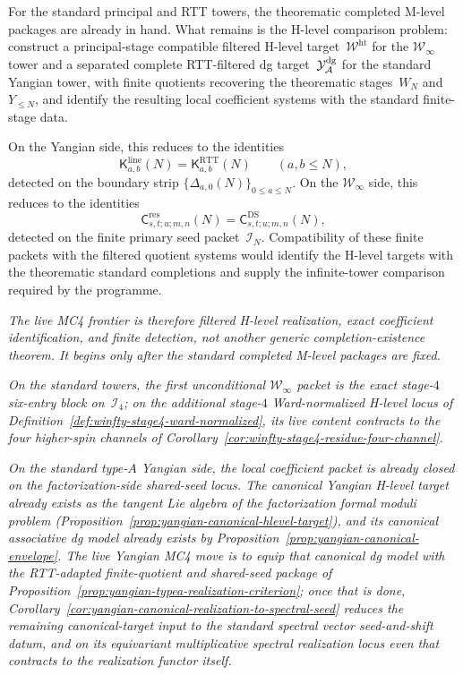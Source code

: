 \begin{conjecture}
\label{conj:master-infinite-generator}
\ClaimStatusConjectured{}
For the standard principal and RTT towers, the theorematic completed
M-level packages are already in hand.  What remains is the H-level
comparison problem: construct a principal-stage compatible filtered
H-level target~$\mathcal{W}^{\mathrm{ht}}$ for the
$\mathcal{W}_\infty$ tower and a separated complete RTT-filtered dg
target~$\mathcal{Y}^{\mathrm{dg}}_{\mathcal{A}}$ for the standard Yangian tower, with finite
quotients recovering the theorematic stages~$W_N$ and~$Y_{\le N}$, and
identify the resulting local coefficient systems with the standard
finite-stage data.

On the Yangian side, this reduces to the identities
\[
\mathsf{K}^{\mathrm{line}}_{a,b}(N)
=\mathsf{K}^{\mathrm{RTT}}_{a,b}(N)
\qquad (a,b\le N),
\]
detected on the boundary strip
$\{\Delta_{a,0}(N)\}_{0\le a\le N}$.
On the $\mathcal{W}_\infty$ side, this reduces to the identities
\[
\mathsf{C}^{\mathrm{res}}_{s,t;u;m,n}(N)
=\mathsf{C}^{\mathrm{DS}}_{s,t;u;m,n}(N),
\]
detected on the finite primary seed packet~$\mathcal{I}_N$.
Compatibility of these finite packets with the filtered quotient systems
would identify the H-level targets with the theorematic standard
completions and supply the infinite-tower comparison required by the
programme.

\emph{The live MC4 frontier is therefore filtered H-level realization,
exact coefficient identification, and finite detection, not another
generic completion-existence theorem.  It begins only after the
standard completed M-level packages are fixed.}

\emph{On the standard towers, the first unconditional
$\mathcal{W}_\infty$ packet is the exact stage-$4$ six-entry block
on~$\mathcal{I}_4$; on the additional stage-$4$ Ward-normalized
H-level locus of
Definition~\ref{def:winfty-stage4-ward-normalized}, its live content
contracts to the four higher-spin channels of
Corollary~\ref{cor:winfty-stage4-residue-four-channel}.}

\emph{On the
standard type-$A$ Yangian side, the local coefficient packet is already
closed on the factorization-side shared-seed locus.  The canonical
Yangian H-level target already exists as the tangent Lie algebra of the
factorization formal moduli problem
\textup{(}Proposition~\textup{\ref{prop:yangian-canonical-hlevel-target}}\textup{)},
and its canonical associative dg model already exists by
Proposition~\ref{prop:yangian-canonical-envelope}.  The live Yangian
MC4 move is to equip that canonical dg model with the RTT-adapted
finite-quotient and shared-seed package of
Proposition~\ref{prop:yangian-typea-realization-criterion}; once that
is done,
Corollary~\ref{cor:yangian-canonical-realization-to-spectral-seed}
reduces the remaining canonical-target input to the standard spectral
vector seed-and-shift datum, and on its equivariant multiplicative
spectral realization locus even that contracts to the realization
functor itself.}


\end{conjecture}
